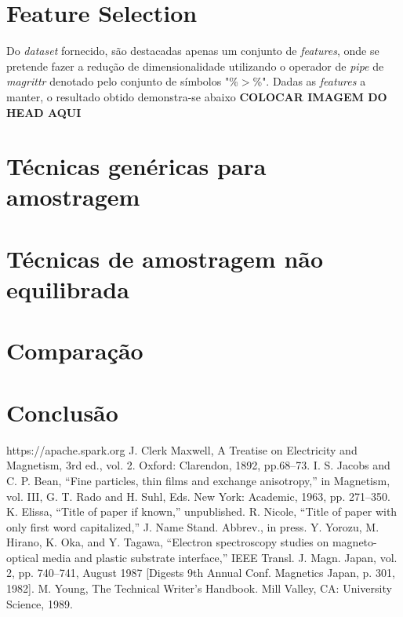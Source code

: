 \documentclass[conference]{IEEEtran}
\begin{document}
\section{Feature Selection}
\par Do \textit{dataset} fornecido, são destacadas apenas um conjunto de \textit{features}, onde se pretende fazer a redução de dimensionalidade utilizando o operador de \textit{pipe} de \textit{magrittr} denotado pelo conjunto de símbolos "\%$>$\%". Dadas as \textit{features} a manter, o resultado obtido demonstra-se abaixo
\textbf{COLOCAR IMAGEM DO HEAD AQUI}

\section{Técnicas genéricas para amostragem}

\section{Técnicas de amostragem não equilibrada}

\section{Comparação}

\section{Conclusão}

\begin{thebibliography}{00}
 https://apache.spark.org
 J. Clerk Maxwell, A Treatise on Electricity and Magnetism, 3rd ed., vol. 2. Oxford: Clarendon, 1892, pp.68--73.
 I. S. Jacobs and C. P. Bean, ``Fine particles, thin films and exchange anisotropy,'' in Magnetism, vol. III, G. T. Rado and H. Suhl, Eds. New York: Academic, 1963, pp. 271--350.
 K. Elissa, ``Title of paper if known,'' unpublished.
 R. Nicole, ``Title of paper with only first word capitalized,'' J. Name Stand. Abbrev., in press.
 Y. Yorozu, M. Hirano, K. Oka, and Y. Tagawa, ``Electron spectroscopy studies on magneto-optical media and plastic substrate interface,'' IEEE Transl. J. Magn. Japan, vol. 2, pp. 740--741, August 1987 [Digests 9th Annual Conf. Magnetics Japan, p. 301, 1982].
 M. Young, The Technical Writer's Handbook. Mill Valley, CA: University Science, 1989.
\end{thebibliography}
\end{document}
